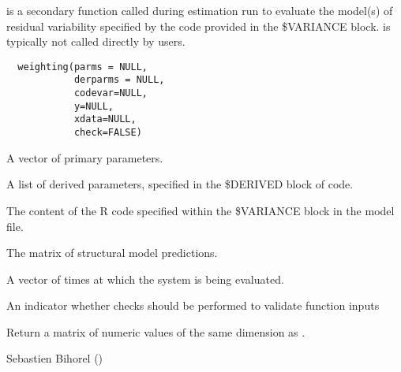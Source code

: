 %
\begin{Description}\relax
{} is a secondary function called during estimation run to
evaluate the model(s) of residual variability specified by the code provided
in the \$VARIANCE block.  is typically not called directly by
users.
\end{Description}
%
\begin{Usage}
\begin{verbatim}
  weighting(parms = NULL,
            derparms = NULL,
            codevar=NULL,
            y=NULL,
            xdata=NULL,
            check=FALSE)
\end{verbatim}
\end{Usage}
%
\begin{Arguments}
\begin{ldescription}
\item[\code{parms}] A vector of primary parameters.
\item[\code{derparms}] A list of derived parameters, specified in the \$DERIVED block
of code.
\item[\code{codevar}] The content of the R code specified within the \$VARIANCE block 
in the model file.
\item[\code{y}] The matrix of structural model predictions.
\item[\code{xdata}] A vector of times at which the system is being evaluated.
\item[\code{check}] An indicator whether checks should be performed to validate 
function inputs
\end{ldescription}
\end{Arguments}
%
\begin{Value}
Return a matrix of numeric values of the same dimension as .
\end{Value}
%
\begin{Author}\relax
Sebastien Bihorel ()
\end{Author}
